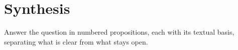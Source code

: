 \chapter{Synthesis}

\begin{objetivo}
Answer the question in numbered propositions, each with its textual basis,
separating what is clear from what stays open.
\end{objetivo}


